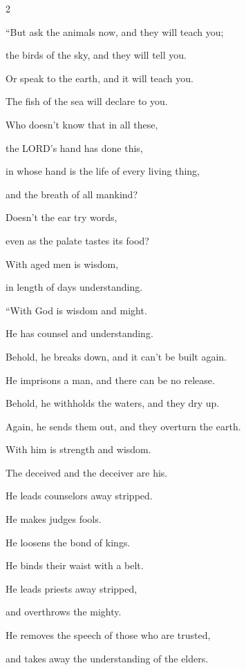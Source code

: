 \begin{multicols}{2}
	\vspace{\baselineskip}
	
	\myverse{}“But ask the animals now, and they will teach you;
	
	the birds of the sky, and they will tell you.
	
	\myverse{}Or speak to the earth, and it will teach you.
	
	The fish of the sea will declare to you.
	
	\myverse{}Who doesn’t know that in all these,
	
	the LORD’s hand has done this,
	
	\myverse{}in whose hand is the life of every living thing,
	
	and the breath of all mankind?
	
	\myverse{}Doesn’t the ear try words,
	
	even as the palate tastes its food?
	
	\myverse{}With aged men is wisdom,
	
	in length of days understanding.
	
	\vspace{\baselineskip}
	
	\myverse{}“With God is wisdom and might.
	
	He has counsel and understanding.
	
	\myverse{}Behold, he breaks down, and it can’t be built again.
	
	He imprisons a man, and there can be no release.
	
	\myverse{}Behold, he withholds the waters, and they dry up.
	
	Again, he sends them out, and they overturn the earth.
	
	\myverse{}With him is strength and wisdom.
	
	The deceived and the deceiver are his.
	
	\myverse{}He leads counselors away stripped.
	
	He makes judges fools.
	
	\myverse{}He loosens the bond of kings.
	
	He binds their waist with a belt.
	
	\myverse{}He leads priests away stripped,
	
	and overthrows the mighty.
	
	\myverse{}He removes the speech of those who are trusted,
	
	and takes away the understanding of the elders.
	

\end{multicols}
